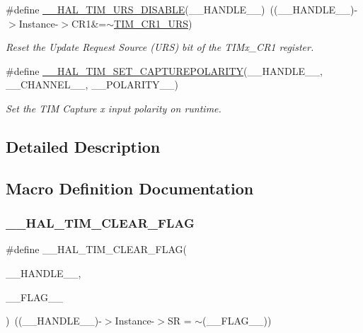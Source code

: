 \begin{DoxyCompactItemize}
\#define \hyperlink{group___t_i_m___exported___macros_gafacb551a4c537e62a0fe740b2f12236c}{\+\_\+\+\_\+\+H\+A\+L\+\_\+\+T\+I\+M\+\_\+\+U\+R\+S\+\_\+\+D\+I\+S\+A\+B\+LE}(\+\_\+\+\_\+\+H\+A\+N\+D\+L\+E\+\_\+\+\_\+)~((\+\_\+\+\_\+\+H\+A\+N\+D\+L\+E\+\_\+\+\_\+)-\/$>$Instance-\/$>$C\+R1\&=$\sim$\hyperlink{group___peripheral___registers___bits___definition_ga06c997c2c23e8bef7ca07579762c113b}{T\+I\+M\+\_\+\+C\+R1\+\_\+\+U\+RS})
\begin{DoxyCompactList}\small\item\em Reset the Update Request Source (U\+RS) bit of the T\+I\+Mx\+\_\+\+C\+R1 register. \end{DoxyCompactList}\item 
\#define \hyperlink{group___t_i_m___exported___macros_gac5d6989516caa67fae23a9329228cdc7}{\+\_\+\+\_\+\+H\+A\+L\+\_\+\+T\+I\+M\+\_\+\+S\+E\+T\+\_\+\+C\+A\+P\+T\+U\+R\+E\+P\+O\+L\+A\+R\+I\+TY}(\+\_\+\+\_\+\+H\+A\+N\+D\+L\+E\+\_\+\+\_\+,  \+\_\+\+\_\+\+C\+H\+A\+N\+N\+E\+L\+\_\+\+\_\+,  \+\_\+\+\_\+\+P\+O\+L\+A\+R\+I\+T\+Y\+\_\+\+\_\+)
\begin{DoxyCompactList}\small\item\em Set the T\+IM Capture x input polarity on runtime. \end{DoxyCompactList}\end{DoxyCompactItemize}


\subsection{Detailed Description}


\subsection{Macro Definition Documentation}
\mbox{\label{group___t_i_m___exported___macros_ga2fe74db6b8cb4badd04ed48e0f5ac7b4}} 
\subsubsection{\texorpdfstring{\+\_\+\+\_\+\+H\+A\+L\+\_\+\+T\+I\+M\+\_\+\+C\+L\+E\+A\+R\+\_\+\+F\+L\+AG}{\_\_HAL\_TIM\_CLEAR\_FLAG}}
{\footnotesize\ttfamily \#define \+\_\+\+\_\+\+H\+A\+L\+\_\+\+T\+I\+M\+\_\+\+C\+L\+E\+A\+R\+\_\+\+F\+L\+AG(\begin{DoxyParamCaption}\item[{}]{\+\_\+\+\_\+\+H\+A\+N\+D\+L\+E\+\_\+\+\_\+,  }\item[{}]{\+\_\+\+\_\+\+F\+L\+A\+G\+\_\+\+\_\+ }\end{DoxyParamCaption})~((\+\_\+\+\_\+\+H\+A\+N\+D\+L\+E\+\_\+\+\_\+)-\/$>$Instance-\/$>$SR = $\sim$(\+\_\+\+\_\+\+F\+L\+A\+G\+\_\+\+\_\+))}



